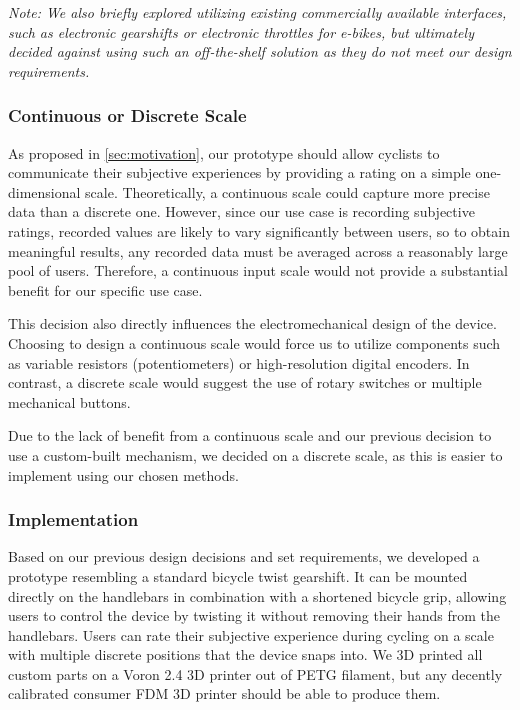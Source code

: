 \bigbreak\noindent
\textit{%
    Note: We also briefly explored utilizing existing commercially available interfaces, such as electronic gearshifts or electronic throttles for e-bikes, but ultimately decided against using such an off-the-shelf solution as they do not meet our design requirements.
}

\subsubsection*{Continuous or Discrete Scale}

As proposed in \autoref{sec:motivation}, our prototype should allow cyclists to communicate their subjective experiences by providing a rating on a simple one-dimensional scale.
Theoretically, a continuous scale could capture more precise data than a discrete one.
However, since our use case is recording subjective ratings, recorded values are likely to vary significantly between users, so to obtain meaningful results, any recorded data must be averaged across a reasonably large pool of users.
Therefore, a continuous input scale would not provide a substantial benefit for our specific use case.

This decision also directly influences the electromechanical design of the device.
Choosing to design a continuous scale would force us to utilize components such as variable resistors (potentiometers) or high-resolution digital encoders.
In contrast, a discrete scale would suggest the use of rotary switches or multiple mechanical buttons.

Due to the lack of benefit from a continuous scale and our previous decision to use a custom-built mechanism, we decided on a discrete scale, as this is easier to implement using our chosen methods.

\subsubsection{Implementation}

Based on our previous design decisions and set requirements, we developed a prototype resembling a standard bicycle twist gearshift.
It can be mounted directly on the handlebars in combination with a shortened bicycle grip, allowing users to control the device by twisting it without removing their hands from the handlebars.
Users can rate their subjective experience during cycling on a scale with multiple discrete positions that the device snaps into.
We 3D printed all custom parts on a Voron 2.4 3D printer out of PETG filament, but any decently calibrated consumer FDM 3D printer should be able to produce them.

